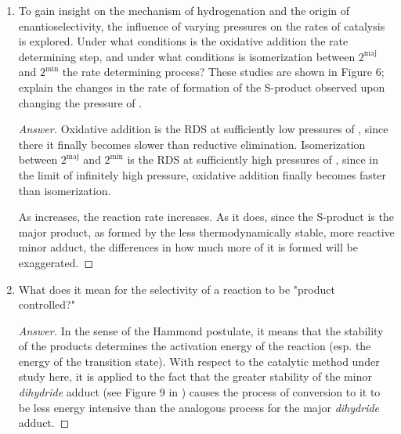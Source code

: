 \documentclass[../psets.tex]{subfiles}
\begin{document}
\begin{enumerate}
\begin{enumerate}
\begin{proof}[Answer]
        \end{proof}
        \item To gain insight on the mechanism of hydrogenation and the origin of enantioselectivity, the influence of varying  pressures on the rates of catalysis is explored. Under what conditions is the oxidative addition the rate determining step, and under what conditions is isomerization between $2^\text{maj}$ and $2^\text{min}$ the rate determining process? These studies are shown in Figure 6; explain the changes in the rate of formation of the S-product observed upon changing the pressure of .
        \begin{proof}[Answer]
            Oxidative addition is the RDS at sufficiently low pressures of , since there it finally becomes slower than reductive elimination. Isomerization between $2^\text{maj}$ and $2^\text{min}$ is the RDS at sufficiently high pressures of , since in the limit of infinitely high  pressure, oxidative addition finally becomes faster than isomerization.\par
            As \ce{[H2]} increases, the reaction rate increases. As it does, since the S-product is the major product, as formed by the less thermodynamically stable, more reactive minor adduct, the differences in how much more of it is formed will be exaggerated.
        \end{proof}
        \item What does it mean for the selectivity of a reaction to be "product controlled?"
        \begin{proof}[Answer]
            In the sense of the Hammond postulate, it means that the stability of the products determines the activation energy of the reaction (esp. the energy of the transition state). With respect to the catalytic method under study here, it is applied to the fact that the greater stability of the minor \emph{dihydride} adduct (see Figure 9 in \textcite{bib:HalpernHydrogenation}) causes the process of conversion to it to be less energy intensive than the analogous process for the major \emph{dihydride} adduct.
        \end{proof}
    \end{enumerate}
\end{enumerate}
\end{document}
